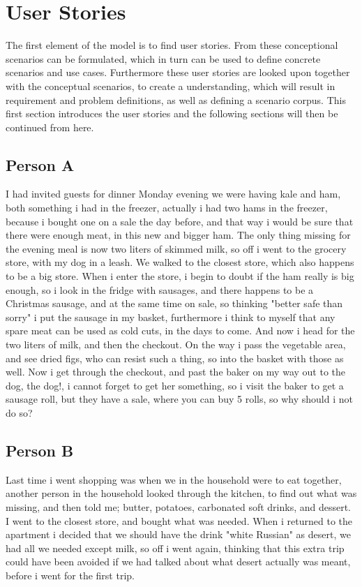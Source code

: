 \section{User Stories} \label{UserStories}
The first element of the model is to find user stories. From these conceptional scenarios can be formulated, which in turn can be used to define concrete scenarios and use cases. Furthermore these user stories are looked upon together with the conceptual scenarios, to create a understanding, which will result in requirement and problem definitions, as well as defining a scenario corpus. This first section introduces the user stories and the following sections will then be continued from here. 

\subsection{Person A}
I had invited guests for dinner Monday evening we were having kale and ham, both something i had in the freezer, actually i had two hams in the freezer, because i bought one on a sale the day before, and that way i would be sure that there were enough meat, in this new and bigger ham. The only thing missing for the evening meal is now two liters of skimmed milk, so off i went to the grocery store, with my dog in a leash. We walked to the closest store, which also happens to be a big store. When i enter the store, i begin to doubt if the ham really is big enough, so i look in the fridge with sausages, and there happens to be a Christmas sausage, and at the same time on sale, so thinking "better safe than sorry" i put the sausage in my basket, furthermore i think to myself that any spare meat can be used as cold cuts, in the days to come. And now i head for the two liters of milk, and then the checkout. On the way i pass the vegetable area, and see dried figs, who can resist such a thing, so into the basket with those as well. Now i get through the checkout, and past the baker on my way out to the dog, the dog!, i cannot forget to get her something, so i visit the baker to get a sausage roll, but they have a sale, where you can buy 5 rolls, so why should i not do so?

\subsection{Person B}
Last time i went shopping was when we in the household were to eat together, another person in the household looked through the kitchen, to find out what was missing, and then told me; butter, potatoes, carbonated soft drinks, and dessert. I went to the closest store, and bought what was needed. When i returned to the apartment i decided that we should have the drink "white Russian" as desert, we had all we needed except milk, so off i went again, thinking that this extra trip could have been avoided if we had talked about what desert actually was meant, before i went for the first trip.
 
